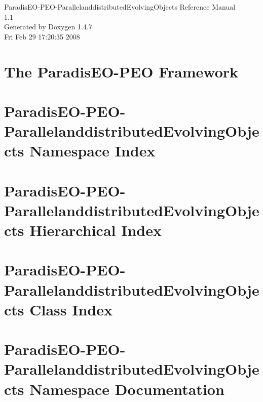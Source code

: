 \documentclass[a4paper]{book}
\begin{document}
\begin{titlepage}
\vspace*{7cm}
\begin{center}
{\Large Paradis\-EO-PEO-Parallelanddistributed\-Evolving\-Objects Reference Manual\\[1ex]\large 1.1 }\\
\vspace*{1cm}
{\large Generated by Doxygen 1.4.7}\\
\vspace*{0.5cm}
{\small Fri Feb 29 17:20:35 2008}\\
\end{center}
\end{titlepage}
\clearemptydoublepage
{}
\tableofcontents
\clearemptydoublepage
{}
\chapter{The Paradis\-EO-PEO Framework }
\label{index}\hypertarget{index}{}
\chapter{Paradis\-EO-PEO-Parallelanddistributed\-Evolving\-Objects Namespace Index}

\chapter{Paradis\-EO-PEO-Parallelanddistributed\-Evolving\-Objects Hierarchical Index}

\chapter{Paradis\-EO-PEO-Parallelanddistributed\-Evolving\-Objects Class Index}

\chapter{Paradis\-EO-PEO-Parallelanddistributed\-Evolving\-Objects Namespace Documentation}

\end{document}

